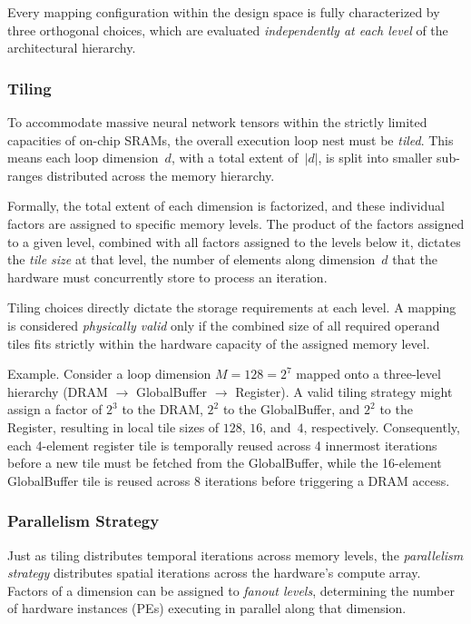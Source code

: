 Every mapping configuration within the design space is fully characterized by three orthogonal choices, which are evaluated \emph{independently at each level} of the architectural hierarchy.

\subsubsection{Tiling}
\label{sec:tiling}

To accommodate massive neural network tensors within the strictly limited capacities of on-chip SRAMs, the overall execution loop nest must be \emph{tiled}.  This means each loop dimension~$d$, with a total extent of~$|d|$, is split into smaller sub-ranges distributed across the memory hierarchy. 

Formally, the total extent of each dimension is factorized, and these individual factors are assigned to specific memory levels. The product of the factors assigned to a given level, combined with all factors assigned to the levels below it, dictates the \emph{tile size} at that level, the number of elements along dimension~$d$ that the hardware must concurrently store to process an iteration. 

Tiling choices directly dictate the storage requirements at each level. A mapping is considered \emph{physically valid} only if the combined size of all required operand tiles fits strictly within the hardware capacity of the assigned memory level.

{Example.}
Consider a loop dimension $M = 128 = 2^7$ mapped onto a three-level hierarchy (DRAM $\to$ GlobalBuffer $\to$ Register). A valid tiling strategy might assign a factor of $2^3$ to the DRAM, $2^2$ to the GlobalBuffer, and $2^2$ to the Register, resulting in local tile sizes of $128$, $16$, and~$4$, respectively. Consequently, each 4-element register tile is temporally reused across 4 innermost iterations before a new tile must be fetched from the GlobalBuffer, while the 16-element GlobalBuffer tile is reused across 8 iterations before triggering a DRAM access.

\subsubsection{Parallelism Strategy}
\label{sec:parallelism}

Just as tiling distributes temporal iterations across memory levels, the \emph{parallelism strategy} distributes spatial iterations across the hardware's compute array. Factors of a dimension can be assigned to \emph{fanout levels}, determining the number of hardware instances (PEs) executing in parallel along that dimension.

